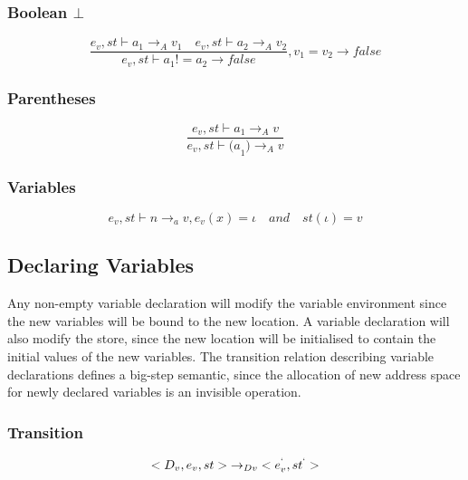 \subsubsection{Boolean $\bot$}
\begin{equation}
	\frac { { e }_{ v },st\vdash { a }_{ 1 }{ \rightarrow  }_{ A }{ v }_{ 1 }\quad { e }_{ v },st\vdash { a }_{ 2 }{ \rightarrow  }_{ A }{ v }_{ 2 } }{ { e }_{ v },st\vdash { a }_{ 1 }!={ a }_{ 2 }{ \rightarrow  }false } ,{ v }_{ 1 }={ v }_{ 2 }\rightarrow false
\end{equation}


\subsubsection{Parentheses}
\begin{equation}
	\frac { { e }_{ v },st\vdash { a }_{ 1 }{ \rightarrow  }_{ A }{ v } }{ { e }_{ v },st\vdash { (a }_{ 1 }){ \rightarrow  }_{ A }{ v } }
\end{equation}


\subsubsection{Variables}
\begin{equation}
	{ e }_{ v },st\vdash n{ \rightarrow  }_{ a }v, { e }_{ v }(x)=\iota\quad and\quad st(\iota )=v
\end{equation}


\subsection*{Declaring Variables}
Any non-empty variable declaration will modify the variable environment since the new variables will be bound to the new location.
A variable declaration will also modify the store, since the new location will be initialised to contain the initial values of the new variables.
The transition relation describing variable declarations defines a big-step semantic, since the allocation of new address space for newly declared variables is an invisible operation.

\subsubsection{Transition}
\begin{equation}
<{ D }_{ v },{ e }_{ v },st>{ \rightarrow  }_{ Dv }<{ e }_{ v }^{ ` },{ st }^{ ` }>
\end{equation}


